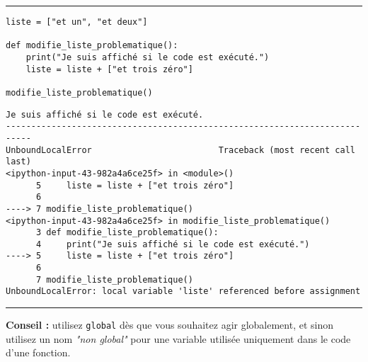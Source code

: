\bigskip
{\hrule height .5mm}
\begin{verbatim}
liste = ["et un", "et deux"]

def modifie_liste_problematique():
    print("Je suis affiché si le code est exécuté.")
    liste = liste + ["et trois zéro"]

modifie_liste_problematique()
\end{verbatim}
 \color{ForestGreen}
\vspace{-1.5em}
\begin{verbatim}
Je suis affiché si le code est exécuté.
---------------------------------------------------------------------------
UnboundLocalError                         Traceback (most recent call last)
<ipython-input-43-982a4a6ce25f> in <module>()
      5     liste = liste + ["et trois zéro"]
      6 
----> 7 modifie_liste_problematique()
<ipython-input-43-982a4a6ce25f> in modifie_liste_problematique()
      3 def modifie_liste_problematique():
      4     print("Je suis affiché si le code est exécuté.")
----> 5     liste = liste + ["et trois zéro"]
      6 
      7 modifie_liste_problematique()
UnboundLocalError: local variable 'liste' referenced before assignment
\end{verbatim} \color{Black}
{\hrule height .5mm}
\bigskip


\textbf{Conseil :} utilisez \texttt{global} dès que vous souhaitez agir globalement, et sinon utilisez un nom \textit{\textit{"non global"}} pour une variable utilisée uniquement dans le code d'une fonction.